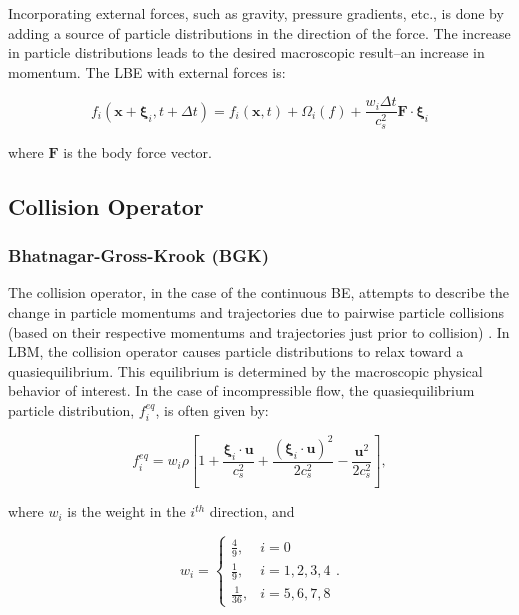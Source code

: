 \documentclass{article}
\newcommand{\pos}{\mathbf{x}}
\newcommand{\pvel}{\boldsymbol{\xi}}
\newcommand{\mvel}{\mathbf{u}}
\begin{document}
Incorporating external forces, such as gravity, pressure gradients, etc., is done by adding a source of particle distributions in the direction of the force.
The increase in particle distributions leads to the desired macroscopic result--an increase in momentum.
The LBE with external forces is:

\begin{equation}
f_i(\pos + \pvel_i, t + \Delta t) = f_i(\pos, t) + \Omega_i(f) + \frac{w_i \Delta t}{c_s^2} \mathbf{F} \cdot \pvel_i
\end{equation}

\noindent where $\mathbf{F}$ is the body force vector.

\subsection{Collision Operator}

\subsubsection{Bhatnagar-Gross-Krook (BGK)} \label{sec:bgk}

The collision operator, in the case of the continuous BE, attempts to describe the change in particle momentums and trajectories due to pairwise particle collisions (based on their respective momentums and trajectories just prior to collision) \cite{Cer90}.
In LBM, the collision operator causes particle distributions to relax toward a quasiequilibrium. %
This equilibrium is determined by the macroscopic physical behavior of interest.
In the case of incompressible flow, the quasiequilibrium particle distribution, $f_i^{eq}$, is often given by:

\begin{equation} \label{eq:feq}
f_i^{eq} = w_i \rho \left[1 + \frac{\pvel_i \cdot \mvel}{c_s^2} + \frac{(\pvel_i \cdot \mvel)^2}{2c_s^2} - \frac{\mvel^2}{2c_s^2} \right],
\end{equation}

\noindent where $w_i$ is the weight in the $i^{th}$ direction, and %

\begin{equation} \label{eq:weights}
w_i = \begin{cases}
    \frac{4}{9}, & i = 0 \\
    \frac{1}{9}, & i = 1, 2, 3, 4 \\
    \frac{1}{36}, & i = 5, 6, 7, 8
\end{cases}.
\end{equation}
\end{document}
